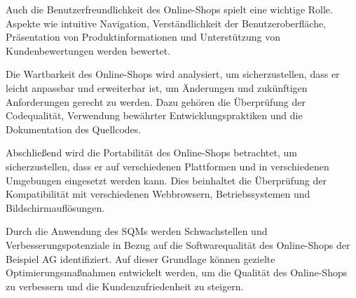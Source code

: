 Auch die Benutzerfreundlichkeit des Online-Shops spielt eine wichtige Rolle. Aspekte wie intuitive Navigation, Verständlichkeit der Benutzeroberfläche, Präsentation von Produktinformationen und Unterstützung von Kundenbewertungen werden bewertet.

Die Wartbarkeit des Online-Shops wird analysiert, um sicherzustellen, dass er leicht anpassbar und erweiterbar ist, um Änderungen und zukünftigen Anforderungen gerecht zu werden. Dazu gehören die Überprüfung der Codequalität, Verwendung bewährter Entwicklungspraktiken und die Dokumentation des Quellcodes.

Abschließend wird die Portabilität des Online-Shops betrachtet, um sicherzustellen, dass er auf verschiedenen Plattformen und in verschiedenen Umgebungen eingesetzt werden kann. Dies beinhaltet die Überprüfung der Kompatibilität mit verschiedenen Webbrowsern, Betriebssystemen und Bildschirmauflösungen.

Durch die Anwendung des SQMs werden Schwachstellen und Verbesserungspotenziale in Bezug auf die Softwarequalität des Online-Shops der Beispiel AG identifiziert. Auf dieser Grundlage können gezielte Optimierungsmaßnahmen entwickelt werden, um die Qualität des Online-Shops zu verbessern und die Kundenzufriedenheit zu steigern.